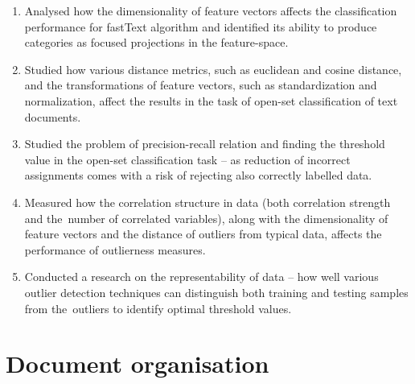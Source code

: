 \begin{enumerate}
    \item Analysed how the dimensionality of feature vectors affects the classification performance for fastText algorithm and identified its ability to produce categories as focused projections in the feature-space.

    \item Studied how various distance metrics, such as euclidean and cosine distance, and the transformations of feature vectors, such as standardization and normalization, affect the results in the task of open-set classification of text documents.

    \item Studied the problem of precision-recall relation and finding the threshold value in the open-set classification task – as reduction of incorrect assignments comes with a risk of rejecting also correctly labelled data.

    \item Measured how the correlation structure in data (both correlation strength and the~number of correlated variables), along with the dimensionality of feature vectors and the distance of outliers from typical data, affects the performance of outlierness measures.

    \item Conducted a research on the representability of data – how well various outlier detection techniques can distinguish both training and testing samples from the~outliers to identify optimal threshold values.
\end{enumerate}


\section{Document organisation}
\label{section:document-organisation}

\lipsum[1]
